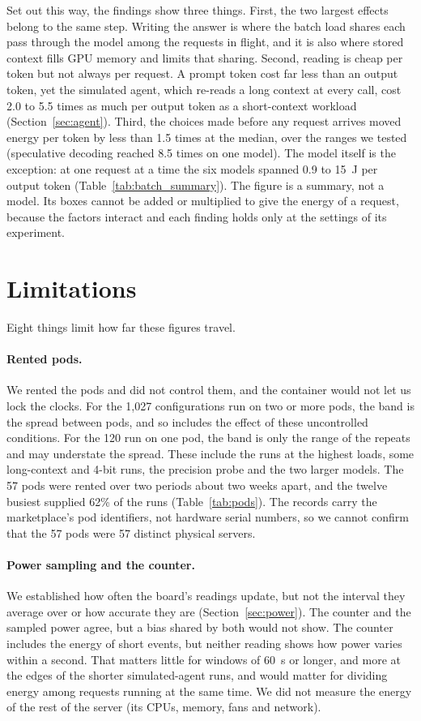 \documentclass[11pt]{article}
\begin{document}
Set out this way, the findings show three things. First, the two largest effects belong to the same step. Writing the answer is where the batch load shares each pass through the model among the requests in flight, and it is also where stored context fills GPU memory and limits that sharing. Second, reading is cheap per token but not always per request. A prompt token cost far less than an output token, yet the simulated agent, which re-reads a long context at every call, cost 2.0 to 5.5 times as much per output token as a short-context workload (Section~\ref{sec:agent}). Third, the choices made before any request arrives moved energy per token by less than 1.5 times at the median, over the ranges we tested (speculative decoding reached 8.5 times on one model). The model itself is the exception: at one request at a time the six models spanned 0.9 to 15~J per output token (Table~\ref{tab:batch_summary}). The figure is a summary, not a model. Its boxes cannot be added or multiplied to give the energy of a request, because the factors interact and each finding holds only at the settings of its experiment.

\section{Limitations}\label{sec:threats}

Eight things limit how far these figures travel.

\paragraph{Rented pods.} We rented the pods and did not control them, and the container would not let us lock the clocks. For the 1,027 configurations run on two or more pods, the band is the spread between pods, and so includes the effect of these uncontrolled conditions. For the 120 run on one pod, the band is only the range of the repeats and may understate the spread. These include the runs at the highest loads, some long-context and 4-bit runs, the precision probe and the two larger models. The 57 pods were rented over two periods about two weeks apart, and the twelve busiest supplied 62\% of the runs (Table~\ref{tab:pods}). The records carry the marketplace's pod identifiers, not hardware serial numbers, so we cannot confirm that the 57 pods were 57 distinct physical servers.

\paragraph{Power sampling and the counter.} We established how often the board's readings update, but not the interval they average over or how accurate they are (Section~\ref{sec:power}). The counter and the sampled power agree, but a bias shared by both would not show. The counter includes the energy of short events, but neither reading shows how power varies within a second. That matters little for windows of 60~s or longer, and more at the edges of the shorter simulated-agent runs, and would matter for dividing energy among requests running at the same time. We did not measure the energy of the rest of the server (its CPUs, memory, fans and network).
\end{document}
